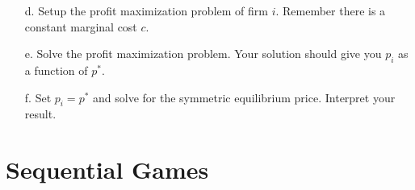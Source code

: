 \documentclass{article}
\begin{document}
\begin{enumerate}
\begin{enumerate}
        \vspace{6cm}
        
        \item[d.] Setup the profit maximization problem of firm $i$. Remember there is a constant marginal cost $c$.
        
        \vspace{3cm}
        
        \item[e.] Solve the profit maximization problem. Your solution should give you $p_i$ as a function of $p^*$.
        
        \vspace{6cm}
        
        \item[f.] Set $p_i=p^*$ and solve for the symmetric equilibrium price. Interpret your result.
        
        \vspace{4cm}
        
        \end{enumerate}
\end{enumerate}

\section{Sequential Games}
\end{document}
